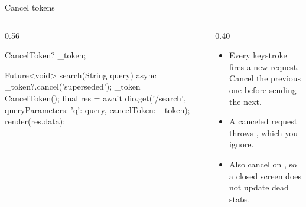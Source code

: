 \documentclass[10pt,aspectratio=169,t]{beamer}
\begin{document}
\begin{frame}[fragile,eyebrow=dio]{Cancel tokens}
  \begin{columns}[T]
    \begin{column}{0.56\textwidth}
\begin{dart}
CancelToken? _token;

Future<void> search(String query) async {
  _token?.cancel('superseded');
  _token = CancelToken();
  final res = await dio.get('/search',
      queryParameters: {'q': query},
      cancelToken: _token);
  render(res.data);
}
\end{dart}
    \end{column}
    \begin{column}{0.40\textwidth}
      \begin{itemize}
        \item Every keystroke fires a new request. Cancel the previous one before sending the next.
        \item A canceled request throws , which you ignore.
        \item Also cancel on , so a closed screen does not update dead state.
      \end{itemize}
    \end{column}
  \end{columns}
\end{frame}
\end{document}
